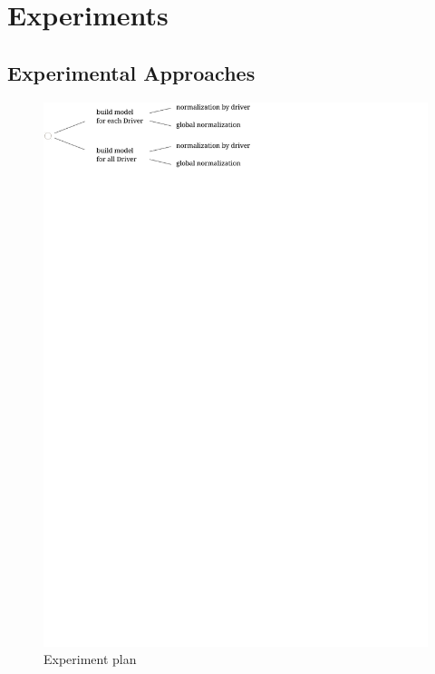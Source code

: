 \documentclass{vldb}
\begin{document}
\section{Experiments}
\label{sec:Experiments}

\subsection{Experimental Approaches}
\label{subsec:ExpPlan}

\begin{figure}
\centering
\includegraphics[trim=0cm 26cm 9.5cm 0cm, clip=true, width=\linewidth]{"pics/experiment-plan"}
\caption{Experiment plan}
\label{fig:Exp-plan}
\end{figure}
\end{document}
